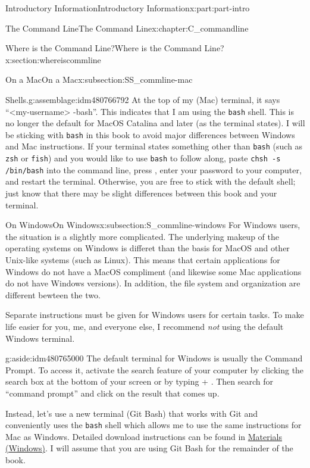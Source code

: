 \documentclass[oneside,10pt,]{book}
\newcommand{\mono}[1]{\texttt{#1}}
\newcommand{\kbd}[1]{\keys{{#1}}}
\begin{document}
\begin{partptx}{Introductory Information}{}{Introductory Information}{}{}{x:part:part-intro}
\begin{chapterptx}{The Command Line}{}{The Command Line}{}{}{x:chapter:C_commandline}
\begin{sectionptx}{Where is the Command Line?}{}{Where is the Command Line?}{}{}{x:section:whereiscommline}
\begin{subsectionptx}{On a Mac}{}{On a Mac}{}{}{x:subsection:SS_commline-mac}
\begin{assemblage}{Shells.}{g:assemblage:idm480766792}
At the top of my (Mac) terminal, it says ``\textless{}my-username\textgreater{}\textemdash{} -bash''. This indicates that I am using the \mono{bash} shell. This is no longer the default for MacOS Catalina and later (as the terminal states). I will be sticking with \mono{bash} in this book to avoid major differences between Windows and Mac instructions. If your terminal states something other than \mono{bash} (such as \mono{zsh} or \mono{fish}) and you would like to use \mono{bash} to follow along, paste \mono{chsh -s /bin/bash}\footnotemark{} into the command line, press \kbd{Enter}, enter your password to your computer, and restart the terminal. Otherwise, you are free to stick with the default shell; just know that there may be slight differences between this book and your terminal.%
\end{assemblage}
%
\end{subsectionptx}
%
%
\typeout{************************************************}
\typeout{************************************************}
%
\begin{subsectionptx}{On Windows}{}{On Windows}{}{}{x:subsection:S_commline-windows}
%
For Windows users, the situation is a slightly more complicated. The underlying makeup of the operating systems on Windows is differet than the basis for MacOS and other Unix-like systems (such as Linux). This means that certain applications for Windows do not have a MacOS compliment (and likewise some Mac applications do not have Windows versions). In addition, the file system and organization are different bewteen the two.%
\par
Separate instructions must be given for Windows users for certain tasks. To make life easier for you, me, and everyone else, I recommend \emph{not} using the default Windows terminal. \begin{aside}{}{g:aside:idm480765000}%
The default terminal for Windows is usually the Command Prompt. To access it, activate the search feature of your computer by clicking the search box at the bottom of your screen or by typing \kbd{Windows} + \kbd{S}. Then search for ``command prompt'' and click on the result that comes up.%
\end{aside}
%
\par
Instead, let's use a new terminal (Git Bash) that works with Git and conveniently uses the \mono{bash} shell which allows me to use the same instructions for Mac as Windows. Detailed download instructions can be found in \hyperref[x:preface:materials-windows]{Materials (Windows)}. I will assume that you are using Git Bash for the remainder of the book.%

\end{subsectionptx}
\end{sectionptx}
\end{chapterptx}
\end{partptx}
\end{document}
